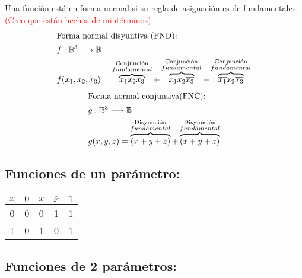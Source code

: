 \documentclass[12pt, twoside]{article}
\begin{document}
Una función \underline{está} en forma normal  si su regla de asignación
es  de  fundamentales.
\textcolor{red}{(Creo que están hechos de mintérminos)}
\begin{align*}
	\intertext{Forma normal disyuntiva (FND):}
	&f:\mathbb{B}^3\longrightarrow\mathbb{B}\\
	&f(x_1,x_2,x_3)=\overbrace{x_1x_2x_3}^{\substack{\text{Conjunción}\\ fundamental}}
	+\overbrace{x_1x_2\overline{x_3}}^{\substack{\text{Conjunción}\\ fundamental}}
	+\overbrace{\overline{x_1}x_2\overline{x_3}}^{\substack{\text{Conjunción}\\ fundamental}}
\end{align*}
\begin{align*}
	\intertext{Forma normal conjuntiva(FNC):}
	&g:\mathbb{B}^3\longrightarrow\mathbb{B}\\
	&g(x,y,z)=\overbrace{(x+y+\overline{z})}^{\substack{\text{Disyunción}\\ fundamental}}
	+\overbrace{(\overline{x}+\overline{y}+z)}^{\substack{\text{Disyunción}\\ fundamental}}
\end{align*}
\subsection*{Funciones de un parámetro:}%
\begin{center}
	\begin{tabular}{*{4}{c|}c}
		$x$ & $0$ & $x$ & $\overline{x}$ & $1$\\
		\hline
		0 & 0 & 0 & 1 & 1\\
		1 & 0 & 1 & 0 & 1\\
	\end{tabular}
\end{center}
\subsection*{Funciones de 2 parámetros:}%
\end{document}
